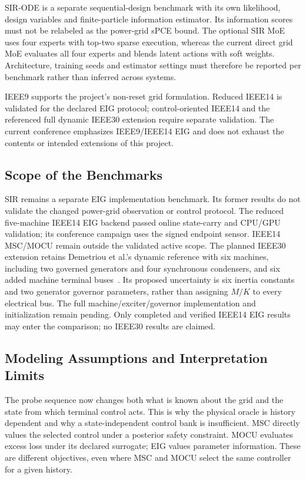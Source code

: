 \documentclass[journal]{IEEEtran}
\begin{document}
SIR-ODE is a separate sequential-design benchmark with its own likelihood,
design variables and finite-particle information estimator. Its information
scores must not be relabeled as the power-grid sPCE bound. The optional SIR
MoE uses four experts with top-two sparse execution, whereas the current
direct grid MoE evaluates all four experts and blends latent actions with
soft weights. Architecture, training seeds and estimator settings must
therefore be reported per benchmark rather than inferred across systems.

IEEE9 supports the project's non-reset grid formulation. Reduced IEEE14 is
validated for the declared EIG protocol; control-oriented IEEE14 and the
referenced full dynamic IEEE30 extension require separate validation.
The current conference emphasizes IEEE9/IEEE14 EIG and does not exhaust
the contents or intended extensions of this project.

\subsection{Scope of the Benchmarks}
SIR remains a separate EIG implementation benchmark. Its former results do
not validate the changed power-grid observation or control protocol.
The reduced five-machine IEEE14 EIG backend passed online state-carry and
CPU/GPU validation; its conference campaign uses the signed endpoint sensor.
IEEE14 MSC/MOCU remain outside the validated active scope.
The planned IEEE30 extension retains Demetriou et al.'s dynamic reference
with six machines, including two governed generators and four synchronous
condensers, and six added machine terminal buses~\cite{demetriou2017dynamic}.
Its proposed uncertainty is six inertia constants and two generator governor
parameters, rather than assigning $M/K$ to every electrical bus. The full
machine/exciter/governor implementation and initialization remain pending.
Only completed and verified IEEE14 EIG results may enter the comparison;
no IEEE30 results are claimed.

\subsection{Modeling Assumptions and Interpretation Limits}
The probe sequence now changes both what is known about the grid and the
state from which terminal control acts. This is why the physical oracle is
history dependent and why a state-independent control bank is insufficient.
MSC directly values the selected control under a posterior safety constraint.
MOCU evaluates excess loss under its declared surrogate; EIG values parameter
information. These are different objectives, even where MSC and MOCU select
the same controller for a given history.
\end{document}
